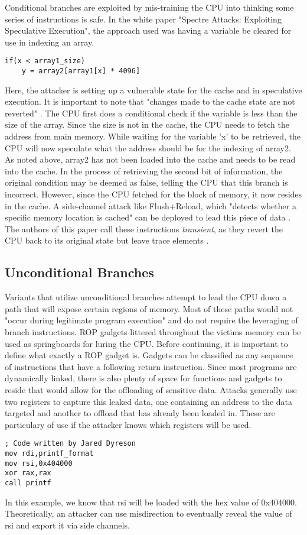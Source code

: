 \documentclass[conference]{IEEEtran}
\begin{document}
Conditional branches are exploited by mis-training the CPU into thinking some series of instructions is safe.
In the white paper "Spectre Attacks: Exploiting Speculative Execution", the approach used was having a variable be cleared for use in indexing an array.
\begin{lstlisting}[frame=single]
if(x < array1_size)
    y = array2[array1[x] * 4096]
\end{lstlisting}
Here, the attacker is setting up a vulnerable state for the cache and in speculative execution.
It is important to note that "changes made to the cache state are not reverted" \autocite[2]{SpectreAttacksExploiting}.
The CPU first does a conditional check if the variable is less than the size of the array.
Since the size is not in the cache, the CPU needs to fetch the address from main memory.
While waiting for the variable 'x' to be retrieved, the CPU will now speculate what the address should be for the indexing of array2.
As noted above, array2 has not been loaded into the cache and needs to be read into the cache.
In the process of retrieving the second bit of information, the original condition may be deemed as false, telling the CPU that this branch is incorrect.
However, since the CPU fetched for the block of memory, it now resides in the cache.
A side-channel attack like Flush+Reload, which "detects whether a specific memory location is cached" can be deployed to lead this piece of data \autocite[5]{MeltdownAnalysis}.
The authors of this paper call these instructions \emph{transient}, as they revert the CPU back to its original state but leave trace elements \autocite{SpectreAttacksExploiting}.

\subsection{Unconditional Branches}

Variants that utilize unconditional branches attempt to lead the CPU down a path that will expose certain regions of memory.
Most of these paths would not "occur during legitimate program execution" \autocite[8]{SpectreAttacksExploiting} and do not require the leveraging of branch instructions.
ROP gadgets littered throughout the victims memory can be used as springboards for luring the CPU.
Before continuing, it is important to define what exactly a ROP gadget is.
Gadgets can be classified as any sequence of instructions that have a following return instruction.
Since most programs are dynamically linked, there is also plenty of space for functions and gadgets to reside that would allow for the offloading of sensitive data.
Attacks generally use two registers to capture this leaked data, one containing an address to the data targeted and another to offload that has already been loaded in.
These are particulary of use if the attacker knows which registers will be used.
\begin{lstlisting}[frame=single]
; Code written by Jared Dyreson
mov rdi,printf_format
mov rsi,0x404000
xor rax,rax
call printf
\end{lstlisting}
In this example, we know that rsi will be loaded with the hex value of 0x404000.
Theoretically, an attacker can use misdirection to eventually reveal the value of rsi and export it via side channels.
\end{document}
